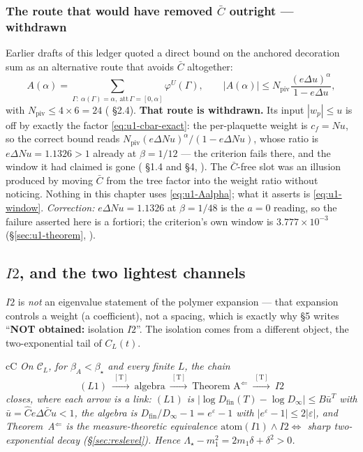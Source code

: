 \subsubsection*{The route that would have removed $\bar C$ outright --- withdrawn}

Earlier drafts of this ledger quoted a direct bound on the anchored decoration sum as an
alternative route that avoids $\bar C$ altogether:
\begin{equation}
A(\alpha)=\sum_{\Gamma:\ \alpha(\Gamma)=\alpha,\ \mathrm{att}\,\Gamma=[0,\alpha]}
\varphi^U(\Gamma),
\qquad
|A(\alpha)|\le N_{\mathrm{piv}}\frac{(e\Delta u)^{\alpha}}{1-e\Delta u},
\label{eq:u1-Aalpha}
\end{equation}
with $N_{\mathrm{piv}}\le4\times6=24$ ( \S2.4). \textbf{That route is
withdrawn.} Its input $|w_p|\le u$ is off by exactly the factor \eqref{eq:u1-cbar-exact}: the
per-plaquette weight is $c_f=Nu$, so the correct bound reads
$N_{\mathrm{piv}}(e\Delta Nu)^{\alpha}/(1-e\Delta Nu)$, whose ratio is
$e\Delta Nu=1.1326>1$ already at $\beta=1/12$ — the criterion fails there, and the window it had
claimed is gone ( \S1.4 and \S4, \LT{}). The $\bar C$-free slot was an
illusion produced by moving $\bar C$ from the tree factor into the weight ratio without noticing.
Nothing in this chapter uses \eqref{eq:u1-Aalpha}; what it asserts is \eqref{eq:u1-window}.
\emph{Correction:} $e\Delta Nu=1.1326$ at $\beta=1/48$ is the $a=0$ reading, so the failure asserted
here is a fortiori; the criterion's own window is $3.777\times10^{-3}$
(\S\ref{sec:u1-theorem}, \LC{}).

\subsection{$I2$, and the two lightest channels}
\label{sec:u1-i2}

\noindent $I2$ is \emph{not} an eigenvalue statement of the polymer expansion --- that expansion
controls a weight (a coefficient), not a spacing, which is exactly why
 \S5 writes ``\textbf{NOT obtained:} isolation $I2$''. The
isolation comes from a different object, the two-exponential tail of $C_L(t)$.

\begin{claimbox}{cC}
\emph{On $\mathcal C_L$, for $\beta_A<\beta_\star$ and every finite $L$, the chain}
\[
(L1)\ \xrightarrow{\ \mathrm{[T]}\ }\ \text{algebra}\ \xrightarrow{\ \mathrm{[T]}\ }\
\text{Theorem~A}^{\Leftarrow}\ \xrightarrow{\ \mathrm{[T]}\ }\ I2
\]
\emph{closes, where each arrow is a \LT{} link: $(L1)$ is $|\log D_{\mathrm{fin}}(T)-\log
D_\infty|\le B\bar u^{T}$ with $\bar u=\hat C e\Delta\bar C u<1$, the algebra is
$D_{\mathrm{fin}}/D_\infty-1=e^{\varepsilon}-1$ with $|e^{\varepsilon}-1|\le2|\varepsilon|$,
and Theorem~A$^{\Leftarrow}$ is the measure-theoretic equivalence
$\text{atom}(I1)\wedge I2\iff$ sharp two-exponential decay
(\S\ref{sec:reslevel}). Hence $\Lambda_\star-m_1^2=2m_1\delta+\delta^2>0$.} \LT{}
\end{claimbox}

